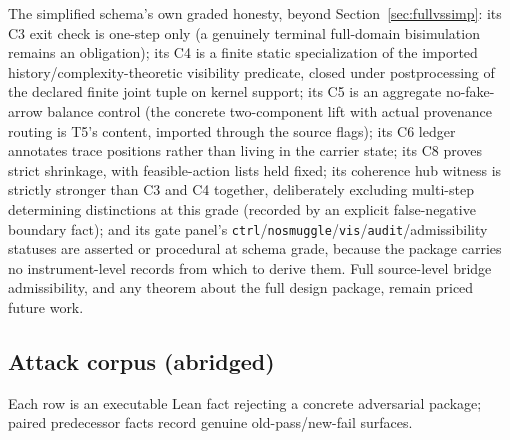 \documentclass[11pt]{article}
\theoremstyle{definition}
\begin{document}
The simplified schema's own graded honesty, beyond
Section~\ref{sec:fullvssimp}: its C3 exit check is one-step only (a genuinely
terminal full-domain bisimulation remains an obligation); its C4 is a finite
static specialization of the imported history/complexity-theoretic visibility
predicate, closed under postprocessing of the declared finite joint tuple on
kernel support; its C5 is an aggregate no-fake-arrow balance control (the
concrete two-component lift with actual provenance routing is T5's content,
imported through the source flags); its C6 ledger annotates trace positions
rather than living in the carrier state; its C8 proves strict shrinkage, with
feasible-action lists held fixed; its coherence hub witness is strictly
stronger than C3 and C4 together, deliberately excluding multi-step
determining distinctions at this grade (recorded by an explicit
false-negative boundary fact); and its gate panel's
\texttt{ctrl}/\texttt{nosmuggle}/\texttt{vis}/\texttt{audit}/admissibility
statuses are asserted or procedural at schema grade, because the package
carries no instrument-level records from which to derive them. Full
source-level bridge admissibility, and any theorem about the full design
package, remain priced future work.

\subsection{Attack corpus (abridged)}

Each row is an executable Lean fact rejecting a concrete adversarial package;
paired predecessor facts record genuine old-pass/new-fail surfaces.
\end{document}
